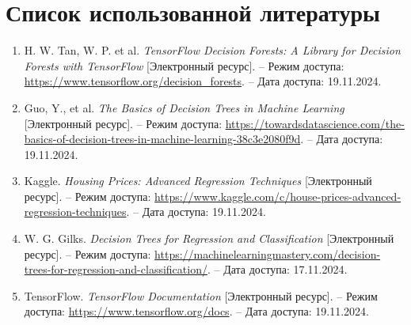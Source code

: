 {\section{Список использованной литературы}
\sloppy
{
    \begin{enumerate}
        \item H. W. Tan, W. P. et al. \textit{TensorFlow Decision Forests: A Library for Decision Forests with TensorFlow} [Электронный ресурс]. – Режим доступа: \url{https://www.tensorflow.org/decision_forests}. – Дата доступа: 19.11.2024.
        \item Guo, Y., et al. \textit{The Basics of Decision Trees in Machine Learning} [Электронный ресурс]. – Режим доступа: \url{https://towardsdatascience.com/the-basics-of-decision-trees-in-machine-learning-38c3e2080f9d}. – Дата доступа: 19.11.2024.
        \item Kaggle. \textit{Housing Prices: Advanced Regression Techniques} [Электронный ресурс]. – Режим доступа: \url{https://www.kaggle.com/c/house-prices-advanced-regression-techniques}. – Дата доступа: 19.11.2024.
        \item W. G. Gilks. \textit{Decision Trees for Regression and Classification} [Электронный ресурс]. – Режим доступа: \url{https://machinelearningmastery.com/decision-trees-for-regression-and-classification/}. – Дата доступа: 17.11.2024.
        \item TensorFlow. \textit{TensorFlow Documentation} [Электронный ресурс]. – Режим доступа: \url{https://www.tensorflow.org/docs}. – Дата доступа: 19.11.2024.

    \end{enumerate}
}
}